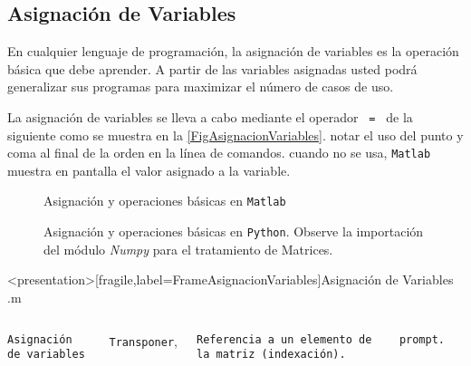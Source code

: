
\subsection{Asignación de Variables}

  En cualquier lenguaje de programación, la asignación 
  de variables es la operación básica que debe aprender.
  A partir de las variables asignadas usted podrá generalizar sus
  programas para maximizar el número de casos de uso. 

  La asignación de variables se lleva a cabo mediante
  el operador \texttt{ = } de la siguiente como se muestra
  en la \autoref{FigAsignacionVariables}. notar el uso 
  del punto y coma al final de la orden en la línea de 
  comandos. cuando no se usa, \texttt{Matlab} muestra en pantalla
  el valor asignado a la variable.

\begin{figure}
\caption{Asignación y operaciones básicas en \texttt{Matlab}\label{FigAsignacionVariables}}
\end{figure}

\begin{figure}
\caption{Asignación y operaciones básicas en \texttt{Python}. Observe la importación del 
        módulo \protect\emph{Numpy} para el tratamiento de Matrices. \protect\label{FigAsignacionVariablesPython}}
\end{figure}

\mode* 

\begin{frame}<presentation>[fragile,label=FrameAsignacionVariables]{Asignación de Variables .m}

\begin{columns}[T]

 \vspace{0.5cm}

\hfill \texttt{Asignación de variables}

\vspace{1cm}

\hfill \texttt{Transponer},

\vspace{2cm}

  \hfill \texttt{Referencia a un elemento de la matriz (indexación).}

\vspace{0.8cm}

\hfill \texttt{prompt.}

\begin{codeblock}
  
\end{codeblock}

\end{columns}
\end{frame}

